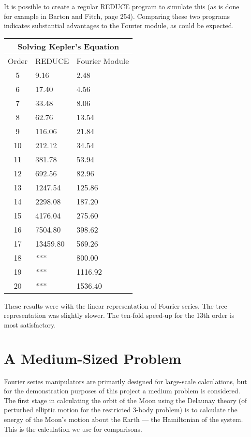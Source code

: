 It is possible to create a regular REDUCE program to simulate this (as
is done for example in Barton and Fitch\cite{Barton72}, page 254).
Comparing these two programs indicates substantial advantages to the
Fourier module, as could be expected.
\medskip
\begin{center}
\begin{tabular}{ | c | l l |}
\multicolumn{3}{c}{\bf Solving Kepler's Equation} \\
\hline
Order   &       REDUCE  &       Fourier Module \\
5       &       9.16    &       2.48    \\
6       &       17.40   &       4.56    \\
7       &       33.48   &       8.06    \\
8       &       62.76   &       13.54   \\
9       &       116.06  &       21.84   \\
10      &       212.12  &       34.54   \\
11      &       381.78  &       53.94   \\
12      &       692.56  &       82.96   \\
13      &       1247.54 &       125.86  \\
14      &       2298.08 &       187.20  \\
15      &       4176.04 &       275.60  \\
16      &       7504.80 &       398.62  \\
17      &       13459.80        &       569.26  \\
18      &       ***     &       800.00  \\
19      &       ***     &       1116.92 \\
20      &       ***     &       1536.40 \\
\hline
\end{tabular}
\end{center}
\medskip
These results were with the linear representation of Fourier series.
The tree representation was slightly slower.  The ten-fold speed-up
for the 13th order is most satisfactory.

\section{A Medium-Sized Problem}

Fourier series manipulators are primarily designed for large-scale
calculations, but for the demonstration purposes of this project a
medium problem is considered.  The first stage in calculating the
orbit of the Moon using the Delaunay theory (of perturbed elliptic
motion for the restricted 3-body problem) is to calculate the energy
of the Moon's motion about the Earth --- the Hamiltonian of the
system.   This is the calculation we use for comparisons.

